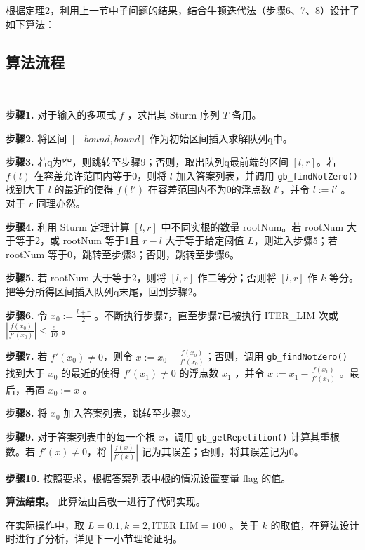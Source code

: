 根据定理2，利用上一节中子问题的结果，结合牛顿迭代法（步骤6、7、8）设计了如下算法：

\subsection{算法流程}

\begin{algorithm}~
	
	\textbf{步骤1.} 对于输入的多项式 $f$ ，求出其 Sturm 序列 $T$ 备用。
	
	\textbf{步骤2.} 将区间 $[-bound, bound]$ 作为初始区间插入求解队列q中。
	
	\textbf{步骤3.} 若q为空，则跳转至步骤9；否则，取出队列q最前端的区间 $[l, r]$。若 $f(l)$ 在容差允许范围内等于0，则将 $l$ 加入答案列表，并调用 \verb|gb_findNotZero()| 找到大于 $l$ 的最近的使得 $f(l')$ 在容差范围内不为0的浮点数 $l'$，并令 $l := l'$ 。对于 $r$ 同理亦然。
	
	\textbf{步骤4.} 利用 Sturm 定理计算 $[l, r]$ 中不同实根的数量 rootNum。若 rootNum 大于等于2，或 rootNum 等于1且 $r - l$ 大于等于给定阈值 $L$，则进入步骤5；若 rootNum 等于0，跳转至步骤3；否则，跳转至步骤6。
	
	\textbf{步骤5.} 若 rootNum 大于等于2，则将 $[l, r]$ 作二等分；否则将 $[l, r]$ 作 $k$ 等分。把等分所得区间插入队列q末尾，回到步骤2。
	
	\textbf{步骤6.} 令 $x_0 := \frac{l + r}{2}$ 。不断执行步骤7，直至步骤7已被执行 ITER\_LIM 次或 $|\frac{f(x_0)}{f'(x_0)}| < \frac{e}{10}$ 。
	
	\textbf{步骤7.} 若 $f'(x_0) \neq 0$，则令 $x := x_0 - \frac{f(x_0)}{f'(x_0)}$；否则，调用 \verb|gb_findNotZero()| 找到大于 $x_0$ 的最近的使得 $f'(x_1) \neq 0$ 的浮点数 $x_1$ ，并令 $x := x_1 - \frac{f(x_1)}{f'(x_1)}$ 。最后，再置 $x_0 := x$ 。
	
	\textbf{步骤8.} 将 $x_0$ 加入答案列表，跳转至步骤3。
	
	\textbf{步骤9.} 对于答案列表中的每一个根 $x$，调用 \verb|gb_getRepetition()| 计算其重根数。若 $f'(x) \neq 0$，将 $|\frac{f(x)}{f'(x)}|$ 记为其误差；否则，将其误差记为0。
	
	\textbf{步骤10.} 按照要求，根据答案列表中根的情况设置变量 flag 的值。
	
	\textbf{算法结束。} 此算法由吕敬一进行了代码实现。
	
	
\end{algorithm}

在实际操作中，取 $L = 0.1, k = 2, \textrm{ITER\_LIM} = 100$ 。关于 $k$ 的取值，在算法设计时进行了分析，详见下一小节理论证明。

